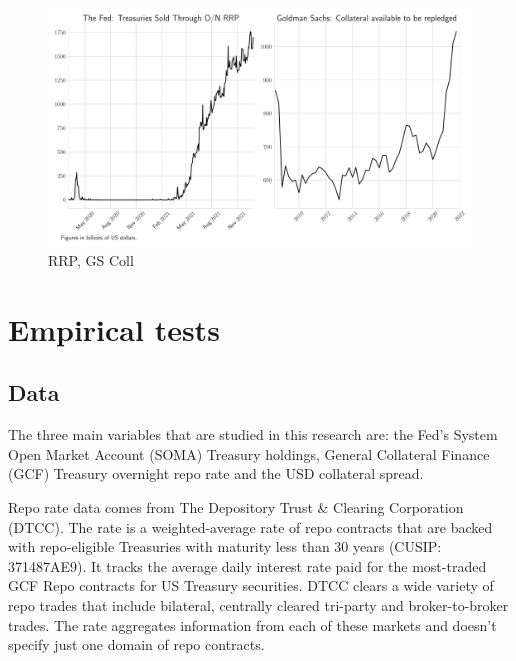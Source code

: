 \documentclass[11pt,a4paper,english,oneside]{article}
\begin{document}

\begin{figure}[htb!]
  \begin{center}
    \caption{RRP, GS Coll}
    \includegraphics[width=0.99\linewidth]{rrp+coll.pdf}
  \end{center}
  \label{fig:rrp+coll}
\end{figure}

\newpage
 
\section{Empirical tests} \label{sec:empirical}

\subsection{Data} \label{sec:data}

The three main variables that are studied in this research are: the Fed's System Open Market Account (SOMA) Treasury holdings, General Collateral Finance (GCF) Treasury overnight repo rate and the USD collateral spread.

Repo rate data comes from The Depository Trust \& Clearing Corporation (DTCC). The rate is a weighted-average rate of repo contracts that are backed with repo-eligible Treasuries with maturity less than 30 years (CUSIP: 371487AE9). It tracks the average daily interest rate paid for the most-traded GCF Repo contracts for US Treasury securities. DTCC clears a wide variety of repo trades that include bilateral, centrally cleared tri-party and broker-to-broker trades. The rate aggregates information from each of these markets and doesn't specify just one domain of repo contracts.
\end{document}

